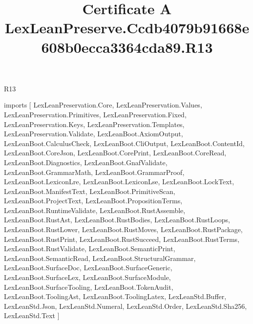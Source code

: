 \begin{lexlean}{R13}
\title{Certificate A LexLeanPreserve.Ccdb4079b91668e608b0ecca3364cda89.R13}
\begin{coremodule}
imports [
  LexLeanPreservation.Core,
  LexLeanPreservation.Values,
  LexLeanPreservation.Primitives,
  LexLeanPreservation.Fixed,
  LexLeanPreservation.Keys,
  LexLeanPreservation.Templates,
  LexLeanPreservation.Validate,
  LexLeanBoot.AxiomOutput,
  LexLeanBoot.CalculusCheck,
  LexLeanBoot.CliOutput,
  LexLeanBoot.ContentId,
  LexLeanBoot.CoreJson,
  LexLeanBoot.CorePrint,
  LexLeanBoot.CoreRead,
  LexLeanBoot.Diagnostics,
  LexLeanBoot.GnafValidate,
  LexLeanBoot.GrammarMath,
  LexLeanBoot.GrammarProof,
  LexLeanBoot.LexiconLre,
  LexLeanBoot.LexiconLse,
  LexLeanBoot.LockText,
  LexLeanBoot.ManifestText,
  LexLeanBoot.PrimitiveScan,
  LexLeanBoot.ProjectText,
  LexLeanBoot.PropositionTerms,
  LexLeanBoot.RuntimeValidate,
  LexLeanBoot.RustAssemble,
  LexLeanBoot.RustAst,
  LexLeanBoot.RustBodies,
  LexLeanBoot.RustLoops,
  LexLeanBoot.RustLower,
  LexLeanBoot.RustMoves,
  LexLeanBoot.RustPackage,
  LexLeanBoot.RustPrint,
  LexLeanBoot.RustSucceed,
  LexLeanBoot.RustTerms,
  LexLeanBoot.RustValidate,
  LexLeanBoot.SemanticPrint,
  LexLeanBoot.SemanticRead,
  LexLeanBoot.StructuralGrammar,
  LexLeanBoot.SurfaceDoc,
  LexLeanBoot.SurfaceGeneric,
  LexLeanBoot.SurfaceLex,
  LexLeanBoot.SurfaceModule,
  LexLeanBoot.SurfaceTooling,
  LexLeanBoot.TokenAudit,
  LexLeanBoot.ToolingAst,
  LexLeanBoot.ToolingLatex,
  LexLeanStd.Buffer,
  LexLeanStd.Json,
  LexLeanStd.Numeral,
  LexLeanStd.Order,
  LexLeanStd.Sha256,
  LexLeanStd.Text
]


\end{coremodule}
\end{lexlean}
